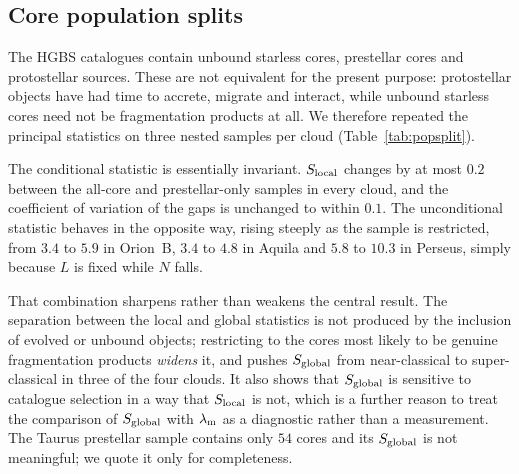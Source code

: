 \documentclass[usenatbib,twoside,twocolumn]{mnras}
\begin{document}
\subsection{Core population splits}
\label{sec:popsplit}

The HGBS catalogues contain unbound starless cores, prestellar cores and protostellar sources. These are not equivalent for the present purpose: protostellar objects have had time to accrete, migrate and interact, while unbound starless cores need not be fragmentation products at all. We therefore repeated the principal statistics on three nested samples per cloud (Table~\ref{tab:popsplit}).

The conditional statistic is essentially invariant. $S_{\rm local}$ changes by at most $0.2$ between the all-core and prestellar-only samples in every cloud, and the coefficient of variation of the gaps is unchanged to within $0.1$. The unconditional statistic behaves in the opposite way, rising steeply as the sample is restricted, from $3.4$ to $5.9$ in Orion~B, $3.4$ to $4.8$ in Aquila and $5.8$ to $10.3$ in Perseus, simply because $L$ is fixed while $N$ falls.

That combination sharpens rather than weakens the central result. The separation between the local and global statistics is not produced by the inclusion of evolved or unbound objects; restricting to the cores most likely to be genuine fragmentation products \emph{widens} it, and pushes $S_{\rm global}$ from near-classical to super-classical in three of the four clouds. It also shows that $S_{\rm global}$ is sensitive to catalogue selection in a way that $S_{\rm local}$ is not, which is a further reason to treat the comparison of $S_{\rm global}$ with $\lambda_{\rm m}$ as a diagnostic rather than a measurement. The Taurus prestellar sample contains only $54$ cores and its $S_{\rm global}$ is not meaningful; we quote it only for completeness.
\end{document}
